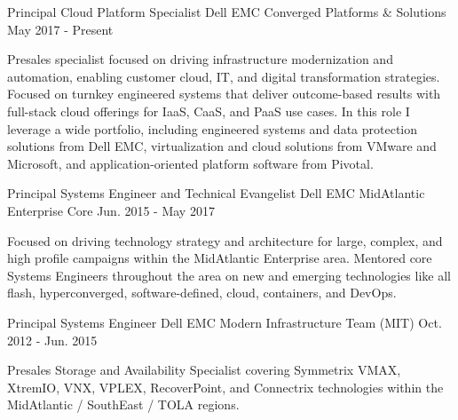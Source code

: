 


\begin{cventries}


\cventry
{Principal Cloud Platform Specialist} %
{Dell EMC} %
{Converged Platforms \& Solutions} %
{May 2017 - Present} %
{ %
\begin{cvitems}
Presales specialist focused on driving infrastructure modernization and automation, enabling customer cloud, IT, and digital transformation strategies. Focused on turnkey engineered systems that deliver outcome-based results with full-stack cloud offerings for IaaS, CaaS, and PaaS use cases. In this role I leverage a wide portfolio, including engineered systems and data protection solutions from Dell EMC, virtualization and cloud solutions from VMware and Microsoft, and application-oriented platform software from Pivotal.
\end{cvitems}
}


\cventry
{Principal Systems Engineer and Technical Evangelist} %
{Dell EMC} %
{MidAtlantic Enterprise Core} %
{Jun. 2015 - May 2017} %
{ %
\begin{cvitems}
Focused on driving technology strategy and architecture for large, complex, and high profile campaigns within the MidAtlantic Enterprise area. Mentored core Systems Engineers throughout the area on new and emerging technologies like all flash, hyperconverged, software-defined, cloud, containers, and DevOps.
\end{cvitems}
}


\cventry
{Principal Systems Engineer} %
{Dell EMC} %
{Modern Infrastructure Team (MIT)} %
{Oct. 2012 - Jun. 2015} %
{ %
\begin{cvitems}
Presales Storage and Availability Specialist covering Symmetrix VMAX, XtremIO, VNX, VPLEX, RecoverPoint, and Connectrix technologies within the MidAtlantic / SouthEast / TOLA regions.
\end{cvitems} 
}


\end{cventries}
